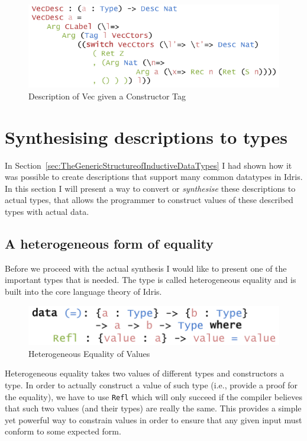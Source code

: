 \documentclass{ituthesis}
\newcommand{\ttconstructor}[1]{\textcolor{constructor-color}{\texttt{#1}}}
\theoremstyle{definition}
\begin{document}
\begin{figure}[H]
\begin{center}
    \includegraphics[scale=0.5]{Figures/VectorDescriptionImproved.png}
\end{center}
\caption{Description of Vec given a Constructor Tag}
\label{fig:vecdescim}
\end{figure}

\section{Synthesising descriptions to types}
\label{sec:SynthesisingDescriptionstoTypes}
In Section~\ref{sec:TheGenericStructureofInductiveDataTypes} I had shown how it was possible to create descriptions that support many common datatypes in Idris.
In this section I will present a way to convert or \textit{synthesise} these descriptions to actual types, that allows the programmer to construct values of these described types with actual data.

\subsection{A heterogeneous form of equality}
\label{sub:AHeterogeneousFormofEquality}
Before we proceed with the actual synthesis I would like to present one of the important types that is needed.
The type is called heterogeneous equality and is built into the core language theory of Idris.
\begin{figure}[ht]
\begin{center}
    \includegraphics[scale=0.5]{Figures/HeterogeneousEquality.png}
\end{center}
\caption{Heterogeneous Equality of Values}
\label{fig:heteq}
\end{figure}
Heterogeneous equality takes two values of different types and constructors a type.
In order to actually construct a value of such type (i.e., provide a proof for the equality), we have to use \ttconstructor{Refl} which will only succeed if the compiler believes that such two values (and their types) are really the same.
This provides a simple yet powerful way to constrain values in order to ensure that any given input must conform to some expected form.
\end{document}
